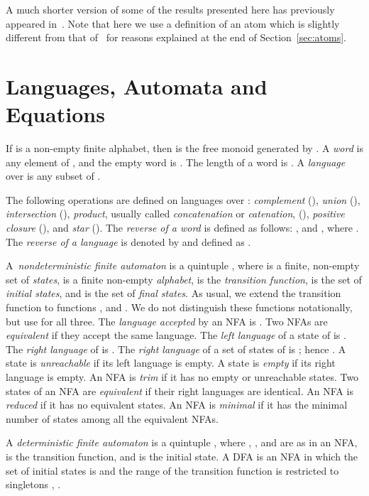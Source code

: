 \documentclass[preprint,12pt]{elsarticle}
\begin{document}
A much shorter version of some of the results presented here has previously 
appeared in~\cite{BrTa11}. Note that here we use a definition of an atom 
which is slightly different from that of~\cite{BrTa11} for reasons explained 
at the end of Section~\ref{sec:atoms}.



\section{Languages, Automata and Equations}
\label{sec:LAE}
If  is a non-empty finite alphabet, then  is the free monoid generated by .
 A \emph{word} is any element of , and the empty word is . The length of a word  is .
A \emph{language} over  is any subset of . 

The following   operations are defined on languages over :  
\emph{complement} \linebreak (),  
\emph{union}  (),  
\emph{intersection} (),  
\emph{product}, usually called  
\emph{concatenation} or \emph{catenation},   
(), \emph{positive closure} (), and  \emph{star} ().
The \emph{reverse  of a word}  is defined as follows: 
, and , where .
The \emph{reverse of a language}  is denoted 
by  and defined as .

A~\emph{nondeterministic finite automaton} is a quintuple 
, where 
 is a finite, non-empty set of \emph{states}, 
 is a finite non-empty \emph{alphabet}, 
 is the  \emph{transition function},
 is the set of  \emph{initial states},
and  is the set of \emph{final states}.
As usual, we extend the transition function to functions 
, and .
We do not distinguish these functions notationally, but use  for all three.
The \emph{language accepted} by an NFA  is 
.
Two NFAs are \emph{equivalent} if they accept the same language. 
The  \emph{left language} of a state  of  is 
. 
The \emph{right language} of  is 
.
The \emph{right language} of a set  of states of  is
; hence
.
A state is \emph{unreachable} if its left language is empty.
A state is \emph{empty} if its right language is empty.
An NFA is \emph{trim} if it has no empty or unreachable states.
Two states  of an NFA are \emph{equivalent} if their right languages are identical. 
An NFA is \emph{reduced} if it has no equivalent states. 
An NFA is \emph{minimal} if it has the minimal number of states among all
the equivalent NFAs.

A \emph{deterministic finite automaton} is a quintuple 
, where
, , and  are as in an NFA, 
 is the transition function, 
and  is the initial state. 
A DFA is an NFA in which the set of initial states is  and 
the range of the transition function is restricted to singletons , .
\end{document}
